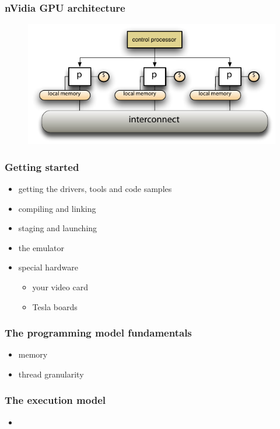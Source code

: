 \begin{frame}[fragile]
%
  \frametitle{nVidia GPU architecture}
%
  \begin{figure}
    \centering
    \includegraphics[width=1.0\linewidth]{figures/simd.pdf}
    \label{fig:simd}
  \end{figure}
%
\end{frame}

\begin{frame}[fragile]
%
  \frametitle{Getting started}
%
  \begin{itemize}
%
  \item getting the drivers, tools and code samples
%
  \item compiling and linking
%
  \item staging and launching
%
  \item the emulator
%
  \item special hardware
    \begin{itemize}
    \item your video card
    \item Tesla boards
    \end{itemize}
%
  \end{itemize}
%
\end{frame}

\begin{frame}[fragile]
%
  \frametitle{The programming model fundamentals}
%
  \begin{itemize}
%
  \item memory
%
  \item thread granularity
%
  \end{itemize}
%
\end{frame}

\begin{frame}[fragile]
%
  \frametitle{The execution model}
%
  \begin{itemize}
%
  \item 
%
  \end{itemize}
%
\end{frame}

